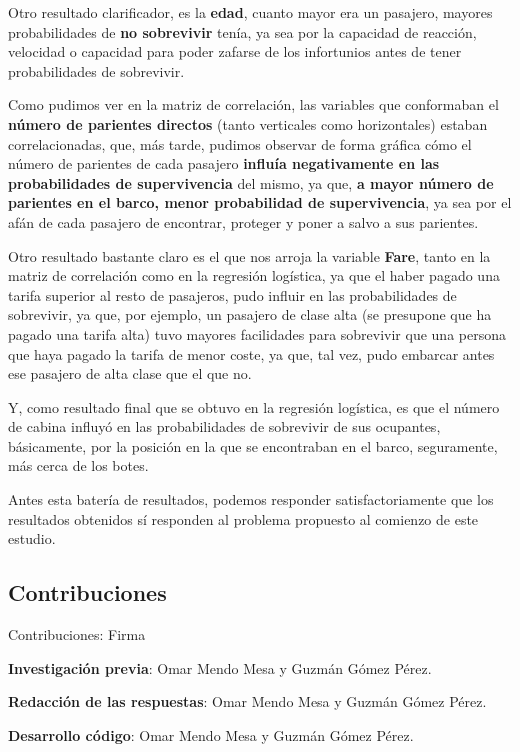 \documentclass[]{article}
\begin{document}
Otro resultado clarificador, es la \textbf{edad}, cuanto mayor era un
pasajero, mayores probabilidades de \textbf{no sobrevivir} tenía, ya sea
por la capacidad de reacción, velocidad o capacidad para poder zafarse
de los infortunios antes de tener probabilidades de sobrevivir.

Como pudimos ver en la matriz de correlación, las variables que
conformaban el \textbf{número de parientes directos} (tanto verticales
como horizontales) estaban correlacionadas, que, más tarde, pudimos
observar de forma gráfica cómo el número de parientes de cada pasajero
\textbf{influía negativamente en las probabilidades de supervivencia}
del mismo, ya que, \textbf{a mayor número de parientes en el barco,
menor probabilidad de supervivencia}, ya sea por el afán de cada
pasajero de encontrar, proteger y poner a salvo a sus parientes.

Otro resultado bastante claro es el que nos arroja la variable
\textbf{Fare}, tanto en la matriz de correlación como en la regresión
logística, ya que el haber pagado una tarifa superior al resto de
pasajeros, pudo influir en las probabilidades de sobrevivir, ya que, por
ejemplo, un pasajero de clase alta (se presupone que ha pagado una
tarifa alta) tuvo mayores facilidades para sobrevivir que una persona
que haya pagado la tarifa de menor coste, ya que, tal vez, pudo embarcar
antes ese pasajero de alta clase que el que no.

Y, como resultado final que se obtuvo en la regresión logística, es que
el número de cabina influyó en las probabilidades de sobrevivir de sus
ocupantes, básicamente, por la posición en la que se encontraban en el
barco, seguramente, más cerca de los botes.

Antes esta batería de resultados, podemos responder satisfactoriamente
que los resultados obtenidos sí responden al problema propuesto al
comienzo de este estudio.

\hypertarget{contribuciones}{%
\subsection{Contribuciones}\label{contribuciones}}

Contribuciones: Firma

\textbf{Investigación previa}: Omar Mendo Mesa y Guzmán Gómez Pérez.

\textbf{Redacción de las respuestas}: Omar Mendo Mesa y Guzmán Gómez
Pérez.

\textbf{Desarrollo código}: Omar Mendo Mesa y Guzmán Gómez Pérez.
\end{document}
